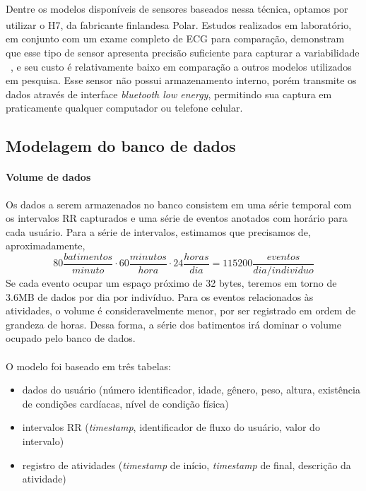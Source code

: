             \paragraph{}
            Dentre os modelos disponíveis de sensores baseados nessa técnica, optamos por utilizar o H7\textsuperscript{\textregistered}, da fabricante finlandesa Polar. Estudos realizados em laboratório, em conjunto com um exame completo de ECG para comparação, demonstram que esse tipo de sensor apresenta precisão suficiente para capturar a variabilidade ~\cite{Plews2017ComparisonMethods, Giles2016ValidityRest.}, e seu custo é relativamente baixo em comparação a outros modelos utilizados em pesquisa. Esse sensor não possui armazenamento interno, porém transmite os dados através de interface \textit{bluetooth low energy}, permitindo sua captura em praticamente qualquer computador ou telefone celular. 

        \subsection{Modelagem do banco de dados}
        \label{modelagembanco}
            
            \paragraph{Volume de dados} Os dados a serem armazenados no banco consistem em uma série temporal com os intervalos RR capturados e uma série de eventos anotados com horário para cada usuário. Para a série de intervalos, estimamos que precisamos de, aproximadamente,
                \begin{equation}
                80 \frac{batimentos}{minuto} \cdot 60 \frac{minutos}{hora} \cdot 24 \frac{horas}{dia} = 115200 \frac{eventos} {dia/individuo}
                \end{equation}
            Se cada evento ocupar um espaço próximo de 32 bytes, teremos em torno de 3.6MB de dados por dia por indivíduo. Para os eventos relacionados às atividades, o volume é consideravelmente menor, por ser registrado em ordem de grandeza de horas. Dessa forma, a série dos batimentos irá dominar o volume ocupado pelo banco de dados.
            
        	\paragraph{}O modelo foi baseado em três tabelas:
            \begin{itemize}
            \item dados do usuário (número identificador, idade, gênero, peso, altura, existência de condições cardíacas, nível de condição física)
            \item intervalos RR (\textit{timestamp}, identificador de fluxo do usuário, valor do intervalo)
            \item registro de atividades (\textit{timestamp} de início, \textit{timestamp} de final, descrição da atividade)
            \end{itemize}
            

